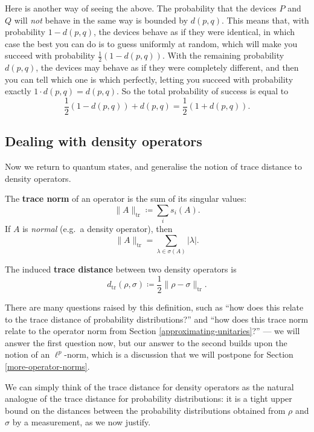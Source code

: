 \documentclass[fleqn,a4paper]{article}
\newenvironment{idea}{\everypar{\setlength{\parindent}{1.5em}}}{}
\theoremstyle{definition}
\theoremstyle{definition}
\theoremstyle{definition}
\theoremstyle{definition}
\theoremstyle{remark}
\begin{document}
Here is another way of seeing the above.
The probability that the devices \(P\) and \(Q\) will \emph{not} behave in the same way is bounded by \(d(p,q)\).
This means that, with probability \(1-d(p,q)\), the devices behave as if they were identical, in which case the best you can do is to guess uniformly at random, which will make you succeed with probability \(\frac{1}{2}(1-d(p,q))\).
With the remaining probability \(d(p,q)\), the devices may behave as if they were completely different, and then you can tell which one is which perfectly, letting you succeed with probability exactly \(1\cdot d(p,q)=d(p,q)\).
So the total probability of success is equal to
\[
  \frac{1}{2}(1-d(p,q)) + d(p,q)
  = \frac{1}{2}(1+d(p,q)).
\]

\hypertarget{dealing-with-density-operators}{%
\subsection{Dealing with density operators}\label{dealing-with-density-operators}}

Now we return to quantum states, and generalise the notion of trace distance to density operators.

\begin{idea}
The \textbf{trace norm} of an operator is the sum of its singular values:
\[
  \|A\|_{\operatorname{tr}} \coloneqq \sum_i s_i(A).
\]
If \(A\) is \emph{normal} (e.g.~a density operator), then
\[
  \|A\|_{\operatorname{tr}} = \sum_{\lambda\in\sigma(A)} |\lambda|.
\]

The induced \textbf{trace distance} between two density operators is
\[
  d_{\operatorname{tr}}(\rho,\sigma) \coloneqq \frac{1}{2}\|\rho-\sigma\|_{\operatorname{tr}}.
\]

\end{idea}

There are many questions raised by this definition, such as ``how does this relate to the trace distance of probability distributions?'' and ``how does this trace norm relate to the operator norm from Section \ref{approximating-unitaries}?'' --- we will answer the first question now, but our answer to the second builds upon the notion of an \(\ell^p\)-norm, which is a discussion that we will postpone for Section \ref{more-operator-norms}.

We can simply think of the trace distance for density operators as the natural analogue of the trace distance for probability distributions: it is a tight upper bound on the distances between the probability distributions obtained from \(\rho\) and \(\sigma\) by a measurement, as we now justify.
\end{document}
